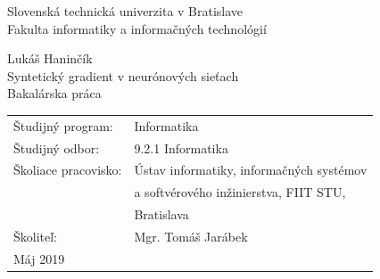 \documentclass[12pt, twoside]{book}
\def\mfrok{2018}
\def\mfnazov{Syntetický gradient v neurónových sieťach}
\def\mftyp{Bakalárska práca}
\def\mfautor{Lukáš Haninčík}
\def\mfskolitel{Mgr. Tomáš Jarábek}
\def\mfkonzultant{tit. Meno Priezvisko, tit. }
\def\mfmiesto{Bratislava, \mfrok}
\def\mfodbor{9.2.1 Informatika}
\def\program{ Informatika }
\def\mfpracovisko{ Ústav informatiky, informačných systémov \\ 
& a softvérového inžinierstva, FIIT STU, \\
& Bratislava }
\begin{document}
\frontmatter

\thispagestyle{empty}
\noindent

\begin{center}
\large
Slovenská technická univerzita v Bratislave\\
Fakulta informatiky a informačných technológií

\vfill
Lukáš Haninčík \\
{\sc\LARGE\mfnazov}\\
\mftyp
\end{center}

\vfill

\noindent
\begin{tabular}{ll}
Študijný program: & \program \\
Študijný odbor: & \mfodbor \\
Školiace pracovisko: & \mfpracovisko \\
Školiteľ: & \mfskolitel \\
Máj 2019
\end{tabular}



\end{document}
